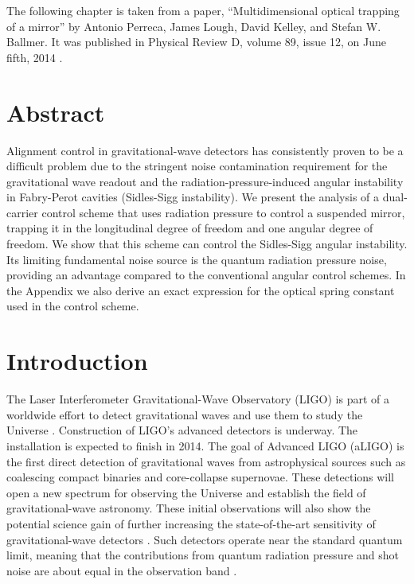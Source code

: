 The following chapter is taken from a paper, ``Multidimensional optical trapping of a mirror'' by Antonio Perreca, James Lough, David Kelley, and Stefan W. Ballmer.
It was published in Physical Review D, volume 89, issue 12, on June fifth, 2014 \cite{Perreca14}.

\section{Abstract}
Alignment control in gravitational-wave detectors has consistently proven to be a difficult problem due to the stringent noise contamination requirement for the gravitational wave readout and the radiation-pressure-induced angular instability in Fabry-Perot cavities (Sidles-Sigg instability). We present the analysis of a dual-carrier control scheme that uses radiation pressure to control a suspended mirror, trapping it in the longitudinal degree of freedom and one angular degree of freedom. We show that this scheme can control the Sidles-Sigg angular instability. Its limiting fundamental noise source is the quantum radiation pressure noise, providing an advantage compared to the conventional angular control schemes. In the Appendix we also derive an exact expression for the optical spring constant used in the control scheme.


\section{Introduction}
\label{sec:int}

The Laser Interferometer Gravitational-Wave Observatory (LIGO) is part of a worldwide 
effort to detect gravitational waves and use them to study the Universe \cite{BPAbbott09}. Construction of 
LIGO's advanced detectors is underway. The installation is expected to finish in 2014. The goal of Advanced LIGO (aLIGO) is the first direct detection of gravitational waves 
from astrophysical sources such as coalescing compact binaries and core-collapse supernovae.
These detections will open a new spectrum for observing the Universe and establish the field of 
gravitational-wave astronomy. 
These initial observations will also show the potential science gain of further increasing the state-of-the-art sensitivity of gravitational-wave detectors \cite{Smith09,Harry10,Losurdo12}. Such detectors operate near the standard quantum limit, meaning that the contributions from quantum radiation pressure and shot noise are about equal in the observation band \cite{Caves80, Ni86}.

